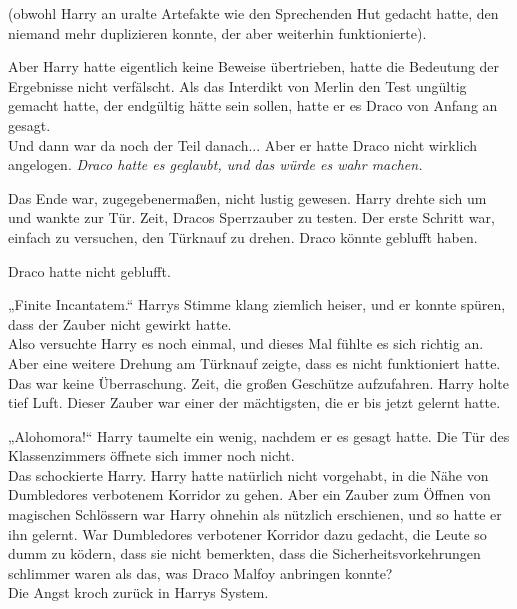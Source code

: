 {(obwohl Harry an uralte Artefakte wie den Sprechenden Hut gedacht hatte, den niemand mehr duplizieren konnte, der aber weiterhin funktionierte).

Aber Harry hatte eigentlich keine Beweise übertrieben, hatte die Bedeutung der Ergebnisse nicht verfälscht. Als das Interdikt von Merlin den Test ungültig gemacht hatte, der endgültig hätte sein sollen, hatte er es Draco von Anfang an gesagt.\\ Und dann war da noch der Teil danach... Aber er hatte Draco nicht wirklich angelogen. \emph{Draco hatte es geglaubt, und das würde es wahr machen.}

Das Ende war, zugegebenermaßen, nicht lustig gewesen. Harry drehte sich um und wankte zur Tür. Zeit, Dracos Sperrzauber zu testen. Der erste Schritt war, einfach zu versuchen, den Türknauf zu drehen. Draco könnte geblufft haben.

Draco hatte nicht geblufft.

„Finite Incantatem.“ Harrys Stimme klang ziemlich heiser, und er konnte spüren, dass der Zauber nicht gewirkt hatte.\\ Also versuchte Harry es noch einmal, und dieses Mal fühlte es sich richtig an. Aber eine weitere Drehung am Türknauf zeigte, dass es nicht funktioniert hatte.\\ Das war keine Überraschung. Zeit, die großen Geschütze aufzufahren. Harry holte tief Luft. Dieser Zauber war einer der mächtigsten, die er bis jetzt gelernt hatte.

„Alohomora!“ Harry taumelte ein wenig, nachdem er es gesagt hatte. Die Tür des Klassenzimmers öffnete sich immer noch nicht.\\ Das schockierte Harry. Harry hatte natürlich nicht vorgehabt, in die Nähe von Dumbledores verbotenem Korridor zu gehen. Aber ein Zauber zum Öffnen von magischen Schlössern war Harry ohnehin als nützlich erschienen, und so hatte er ihn gelernt. War Dumbledores verbotener Korridor dazu gedacht, die Leute so dumm zu ködern, dass sie nicht bemerkten, dass die Sicherheitsvorkehrungen schlimmer waren als das, was Draco Malfoy anbringen konnte?\\ Die Angst kroch zurück in Harrys System.

}
